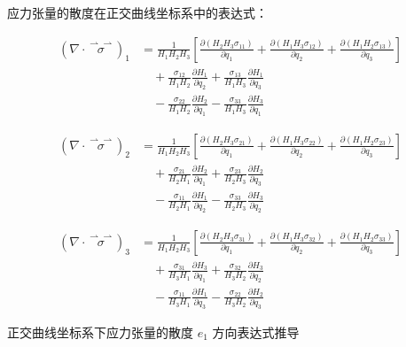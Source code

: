 \documentclass[12pt, a4paper, oneside, UTF8]{ctexbook}  %
\newcommand{\vvec}{\overset{\rightharpoonup\!\!\!\! \rightharpoonup}}
\begin{document}
\begin{proposition}
    应力张量的散度在正交曲线坐标系中的表达式：

    \begin{align*}
    (\nabla \cdot \vvec{\sigma})_1 &= \frac{1}{H_1 H_2 H_3} \left[ 
        \frac{\partial (H_2 H_3 \sigma_{11})}{\partial q_1} + 
        \frac{\partial (H_1 H_3 \sigma_{12})}{\partial q_2} + 
        \frac{\partial (H_1 H_2 \sigma_{13})}{\partial q_3} 
    \right] \\
    &\quad + \frac{\sigma_{12}}{H_1 H_2} \frac{\partial H_1}{\partial q_2} + 
        \frac{\sigma_{13}}{H_1 H_3} \frac{\partial H_1}{\partial q_3} \\
    &\quad - \frac{\sigma_{22}}{H_1 H_2} \frac{\partial H_2}{\partial q_1} - 
        \frac{\sigma_{33}}{H_1 H_3} \frac{\partial H_3}{\partial q_1}
    \end{align*}
    
    \begin{align*}
    (\nabla \cdot \vvec{\sigma})_2 &= \frac{1}{H_1 H_2 H_3} \left[ 
        \frac{\partial (H_2 H_3 \sigma_{21})}{\partial q_1} + 
        \frac{\partial (H_1 H_3 \sigma_{22})}{\partial q_2} + 
        \frac{\partial (H_1 H_2 \sigma_{23})}{\partial q_3} 
    \right] \\
    &\quad + \frac{\sigma_{21}}{H_2 H_1} \frac{\partial H_2}{\partial q_1} + 
        \frac{\sigma_{23}}{H_2 H_3} \frac{\partial H_2}{\partial q_3} \\
    &\quad - \frac{\sigma_{11}}{H_2 H_1} \frac{\partial H_1}{\partial q_2} - 
        \frac{\sigma_{33}}{H_2 H_3} \frac{\partial H_3}{\partial q_2}
    \end{align*}
    
    \begin{align*}
    (\nabla \cdot \vvec{\sigma})_3 &= \frac{1}{H_1 H_2 H_3} \left[ 
        \frac{\partial (H_2 H_3 \sigma_{31})}{\partial q_1} + 
        \frac{\partial (H_1 H_3 \sigma_{32})}{\partial q_2} + 
        \frac{\partial (H_1 H_2 \sigma_{33})}{\partial q_3} 
    \right] \\
    &\quad + \frac{\sigma_{31}}{H_3 H_1} \frac{\partial H_3}{\partial q_1} + 
        \frac{\sigma_{32}}{H_3 H_2} \frac{\partial H_3}{\partial q_2} \\
    &\quad - \frac{\sigma_{11}}{H_3 H_1} \frac{\partial H_1}{\partial q_3} - 
        \frac{\sigma_{22}}{H_3 H_2} \frac{\partial H_2}{\partial q_3}
    \end{align*}
    \begin{tui}
    正交曲线坐标系下应力张量的散度 \( e_1 \) 方向表达式推导
        

\end{tui}
\end{proposition}
\end{document}
